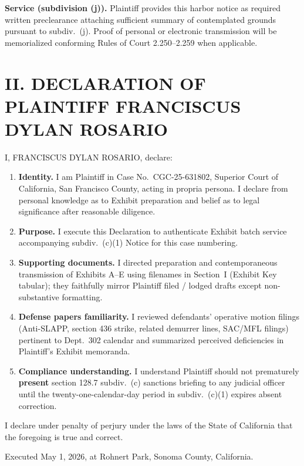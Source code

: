 \textbf{Service (subdivision (j)).} Plaintiff provides this harbor notice as required written preclearance attaching sufficient summary of contemplated grounds pursuant to subdiv.\ (j). Proof of personal or electronic transmission will be memorialized conforming Rules of Court 2.250--2.259 when applicable.

\section*{II. DECLARATION OF PLAINTIFF FRANCISCUS DYLAN ROSARIO}

I, FRANCISCUS DYLAN ROSARIO, declare:

\begin{enumerate}
\item \textbf{Identity.} I am Plaintiff in Case No.\ CGC-25-631802, Superior Court of California, San Francisco County, acting in propria persona. I declare from personal knowledge as to Exhibit preparation and belief as to legal significance after reasonable diligence.
\item \textbf{Purpose.} I execute this Declaration to authenticate Exhibit batch service accompanying subdiv.\ (c)(1) Notice for this case numbering.
\item \textbf{Supporting documents.} I directed preparation and contemporaneous transmission of Exhibits A--E using filenames in Section~I (Exhibit Key tabular); they faithfully mirror Plaintiff filed / lodged drafts except non-substantive formatting.
\item \textbf{Defense papers familiarity.} I reviewed defendants' operative motion filings (Anti-SLAPP, section 436 strike, related demurrer lines, SAC/MFL filings) pertinent to Dept.\ 302 calendar and summarized perceived deficiencies in Plaintiff's Exhibit memoranda.
\item \textbf{Compliance understanding.} I understand Plaintiff should not prematurely \textbf{present} section 128.7 subdiv.\ (c) sanctions briefing to any judicial officer until the twenty-one-calendar-day period in subdiv.\ (c)(1) expires absent correction.
\end{enumerate}

I declare under penalty of perjury under the laws of the State of California that the foregoing is true and correct.\par
Executed May 1, 2026, at Rohnert Park, Sonoma County, California.\par
\vspace{0.2\baselineskip}


